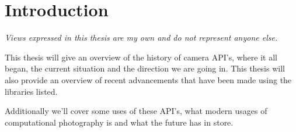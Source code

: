 \chapter{Introduction\label{intro}}
\textit{Views expressed in this thesis are my own and do not represent anyone else.}

This thesis will give an overview of the history of camera API's, where it all
began, the current situation and the direction we are going in. This thesis
will also provide an overview of recent advancements that have been made using
the libraries listed.

Additionally we'll cover some uses of these API's, what modern usages of
computational photography is and what the future has in store.

